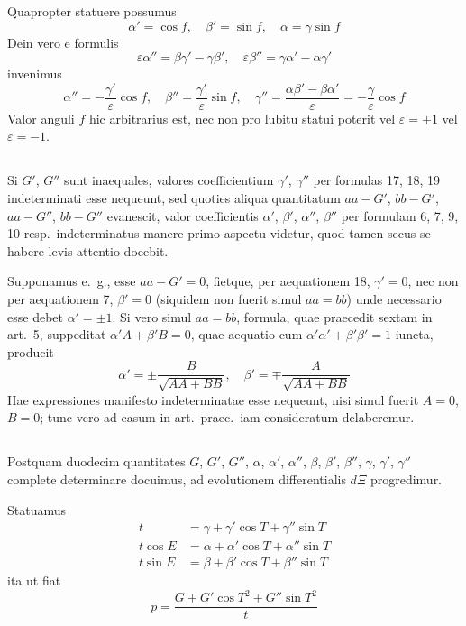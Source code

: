 \documentclass[12pt,a4paper]{article}
\begin{document}
Quapropter statuere possumus
\[
\alpha' = \cos f, \quad \beta' = \sin f, \quad \alpha = \gamma\sin f
\]
Dein vero e formulis
\[
\varepsilon\alpha'' = \beta\gamma' - \gamma\beta', \quad \varepsilon\beta'' = \gamma\alpha' - \alpha\gamma'
\]
invenimus
\[
\alpha'' = -\frac{\gamma'}{\varepsilon}\cos f, \quad \beta'' = \frac{\gamma'}{\varepsilon}\sin f, \quad \gamma'' = \frac{\alpha\beta' - \beta\alpha'}{\varepsilon} = -\frac{\gamma}{\varepsilon}\cos f
\]
Valor anguli $f$ hic arbitrarius est, nec non pro lubitu statui poterit vel $\varepsilon = +1$ vel $\varepsilon = -1$.

\setcounter{subsection}{10}
\subsection{}

Si $G'$, $G''$ sunt inaequales, valores coefficientium $\gamma'$, $\gamma''$ per formulas 17, 18, 19 indeterminati esse nequeunt, sed quoties aliqua quantitatum $aa-G'$, $bb-G'$, $aa-G''$, $bb-G''$ evanescit, valor coefficientis $\alpha'$, $\beta'$, $\alpha''$, $\beta''$ per formulam 6, 7, 9, 10 resp.\ indeterminatus manere primo aspectu videtur, quod tamen secus se habere levis attentio docebit.

Supponamus e.~g., esse $aa-G'=0$, fietque, per aequationem 18, $\gamma'=0$, nec non per aequationem 7, $\beta'=0$ (siquidem non fuerit simul $aa=bb$) unde necessario esse debet $\alpha'=\pm 1$. Si vero simul $aa=bb$, formula, quae praecedit sextam in art.~5, suppeditat $\alpha' A + \beta' B = 0$, quae aequatio cum $\alpha'\alpha' + \beta'\beta' = 1$ iuncta, producit
\[
\alpha' = \pm\frac{B}{\sqrt{AA+BB}}, \quad \beta' = \mp\frac{A}{\sqrt{AA+BB}}
\]
Hae expressiones manifesto indeterminatae esse nequeunt, nisi simul fuerit $A=0$, $B=0$; tunc vero ad casum in art.\ praec.\ iam consideratum delaberemur.

\setcounter{subsection}{11}
\subsection{}

Postquam duodecim quantitates $G$, $G'$, $G''$, $\alpha$, $\alpha'$, $\alpha''$, $\beta$, $\beta'$, $\beta''$, $\gamma$, $\gamma'$, $\gamma''$ complete determinare docuimus, ad evolutionem differentialis $d\Xi$ progredimur.

Statuamus
\[
\begin{aligned}
t &= \gamma + \gamma'\cos T + \gamma''\sin T \\
t\cos E &= \alpha + \alpha'\cos T + \alpha''\sin T \\
t\sin E &= \beta + \beta'\cos T + \beta''\sin T
\end{aligned}
\tag{20,21,22}
\]
ita ut fiat
\[
p = \frac{G + G'\cos T^2 + G''\sin T^2}{t}
\]
\end{document}
